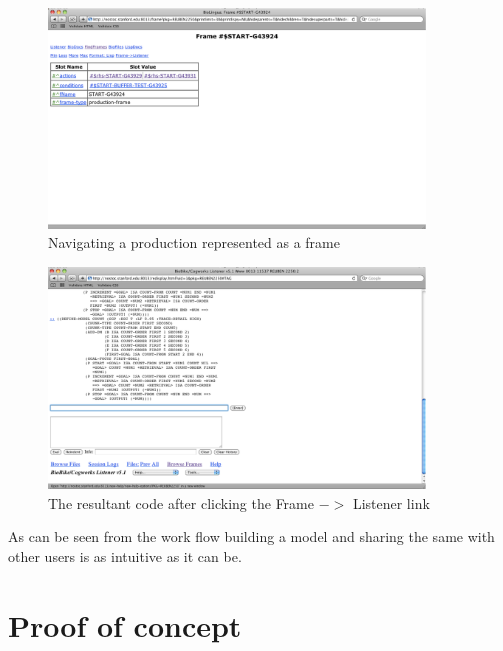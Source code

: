 \begin{figure}[htp]
  \centering
  \includegraphics[width=100mm]{NavigatingAProduction}
  \caption{Navigating a production represented as a frame}
  \label{NavigatingAProduction}
\end{figure}

\begin{figure}[htp]
  \centering
  \includegraphics[width=100mm]{ConvertFrameToImage}
  \caption{The resultant code after clicking the Frame $->$ Listener
    link}
  \label{ConvertFrameToImage}
\end{figure}

As can be seen from the work flow building a model and sharing the
same with other users is as intuitive as it can be.


\section{Proof of concept}

